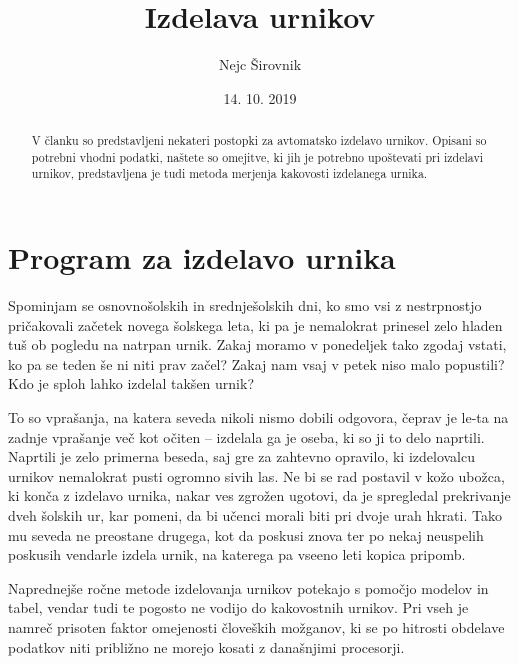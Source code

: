 \documentclass[10pt, a4paper]{article}
\begin{document}

\title{Izdelava urnikov}
\author{Nejc Širovnik}
\date{14. 10. 2019}
\maketitle

\begin{abstract}
V članku so predstavljeni nekateri postopki za avtomatsko izdelavo urnikov. Opisani so
potrebni vhodni podatki, naštete so omejitve, ki jih je potrebno upoštevati pri izdelavi
urnikov, predstavljena je tudi metoda merjenja kakovosti izdelanega urnika.
\end{abstract}

\section{Program za izdelavo urnika}

Spominjam se osnovnošolskih in srednješolskih dni, ko smo vsi z nestrpnostjo pričakovali
začetek novega šolskega leta, ki pa je nemalokrat prinesel zelo hladen tuš ob pogledu na
natrpan urnik. Zakaj moramo v ponedeljek tako zgodaj vstati, ko pa se teden še ni niti
prav začel? Zakaj nam vsaj v petek niso malo popustili? Kdo je sploh lahko izdelal
takšen urnik?

To so vprašanja, na katera seveda nikoli nismo dobili odgovora, čeprav je le-ta na zadnje
vprašanje več kot očiten -- izdelala ga je oseba, ki so ji to delo naprtili. Naprtili je
zelo primerna beseda, saj gre za zahtevno opravilo, ki izdelovalcu urnikov nemalokrat
pusti ogromno sivih las. Ne bi se rad postavil v kožo ubožca, ki konča z izdelavo urnika,
nakar ves zgrožen ugotovi, da je spregledal prekrivanje dveh šolskih ur, kar pomeni, da
bi učenci morali biti pri dvoje urah hkrati. Tako mu seveda ne preostane drugega, kot da
poskusi znova ter po nekaj neuspelih poskusih vendarle izdela urnik, na katerega pa vseeno
leti kopica pripomb.

Naprednejše ročne metode izdelovanja urnikov potekajo s pomočjo modelov in tabel, vendar
tudi te pogosto ne vodijo do kakovostnih urnikov. Pri vseh je namreč prisoten faktor
omejenosti človeških možganov, ki se po hitrosti obdelave podatkov niti približno ne
morejo kosati z današnjimi procesorji.
\end{document}
